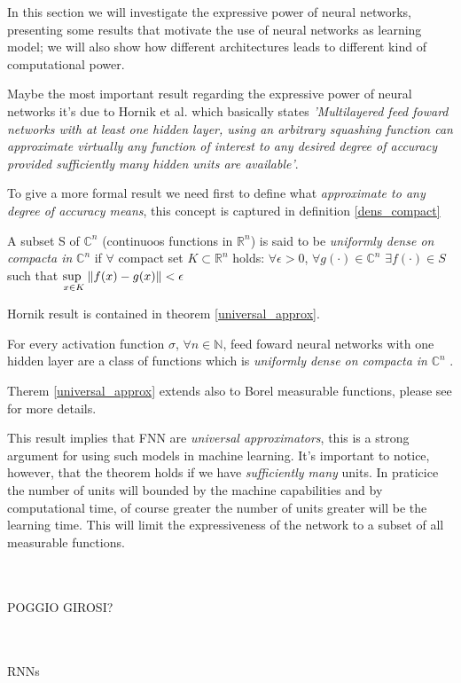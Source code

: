 In this section we will investigate the expressive power of neural networks, presenting some results that motivate the use of neural networks as learning
model; we will also show how different architectures leads to different kind of computational power.
 

Maybe the most important result regarding the expressive power of neural networks it's due to Hornik et al. \cite{Hornik89} which basically states
\textit{'Multilayered feed foward networks with at least one hidden layer, using an arbitrary squashing function can approximate virtually any function
of interest to any desired degree of accuracy provided sufficiently many hidden units are available'}.

To give a more formal result we need first to define what \textit{approximate to any degree of accuracy means}, this concept is captured in definition
\ref{dens_compact}
 
\begin{defn}
 A subset S of $\mathbb{C}^n$ (continuoos functions in $\mathbb{R}^n$) is said to be \textit{uniformly dense on compacta in} $\mathbb{C}^n$ if $\forall$
 compact set $K\subset \mathbb{R}^n$ holds: $\forall \epsilon >0$, $\forall g(\cdot) \in \mathbb{C}^n$ $\exists f(\cdot) \in S$ such that 
 $\underset{x \in K}{\text{sup  }} \left\Vert f(x)-g(x) \right\Vert<\epsilon$ 
 \label{dens_compact}
\end{defn}

Hornik result is contained in theorem \ref{universal_approx}.
\begin{thm}
 For every activation function $\sigma$, $\forall n\in \mathbb{N}$, feed foward neural
 networks with one hidden layer are a class of functions which is \textit{uniformly dense on compacta in} $\mathbb{C}^n$
\label{universal_approx}.
\end{thm}
Therem \ref{universal_approx} extends also to Borel measurable functions, please see \cite{Hornik89} for more details.


This result implies that FNN are \textit{universal approximators}, this is a strong argument for using such models in machine learning.
It's important to notice, however, that the theorem holds if we have \textit{sufficiently many} units. In praticice the number of units will bounded
by the machine capabilities and by computational time, of course greater the number of units greater will be the learning time. This will limit
the expressiveness of the network to a subset of all measurable functions.

\\\\POGGIO GIROSI?

\\\\RNNs

